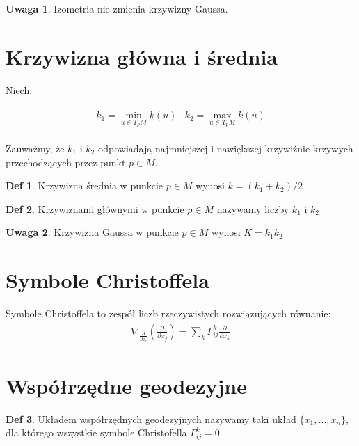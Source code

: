 \documentclass{article}
\theoremstyle{plain}
\theoremstyle{definition}
\newtheorem*{defi*}{Def}
\theoremstyle{definition}
\newtheorem*{not*}{Uwaga}
\begin{document}
\begin{not*}
Izometria nie zmienia krzywizny Gaussa.
\end{not*}

\section{Krzywizna główna i średnia}
Niech:

\begin{align*}
    \begin{split}
        k_1 = \min_{u \in T_pM} k(u)
    \end{split}
    \begin{split}
        k_2 = \max_{u \in T_pM} k(u)
    \end{split}
\end{align*}

\noindent Zauważmy, że $k_1$ i $k_2$ odpowiadają najmniejszej i nawiększej krzywiźnie krzywych przechodzących przez punkt $p \in M$.

\begin{defi*}
Krzywizna średnia w punkcie $p \in M$ wynosi $k = (k_1 + k_2) / 2$
\end{defi*}

\begin{defi*}
Krzywiznami głównymi w punkcie $p \in M$ nazywamy liczby $k_1$ i $k_2$
\end{defi*}

\begin{not*}
Krzywizna Gaussa w punkcie $p \in M$ wynosi $K = k_1 k_2$
\end{not*}

\section{Symbole Christoffela}
Symbole Christoffela to zespół liczb rzeczywistych rozwiązujących równanie:
\begin{align*}
    \nabla_{\frac{\partial}{\partial x_i}}\left( \frac{\partial}{\partial x_j} \right) = \sum_k \Gamma_{ij}^k \frac{\partial}{\partial x_k}
\end{align*}

\section{Współrzędne geodezyjne}
\begin{defi*}
Układem współrzędnych geodezyjnych nazywamy taki układ $ \{  x_1, \ldots, x_n \} $, dla którego wszystkie symbole Christofella $ \Gamma_{ij}^k = 0$
\end{defi*}
\end{document}
